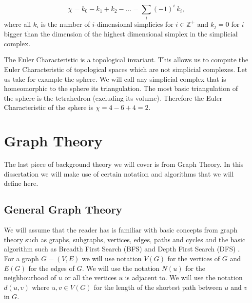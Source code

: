 %
%
%

%
%

$$ \chi = k_0 - k_1 + k_2 - ... = \sum_{i}{(-1)^i~k_i}, $$
where all $k_i$ is the number of $i$-dimensional simplicies for $i \in \mathbb{Z}^+$ and $k_j = 0$ for $i$ bigger than the dimension of the highest dimensional simplex in the simplicial complex.

The Euler Characteristic is a topological invariant. This allows us to compute the Euler Characteristic of topological spaces which are not simplicial complexes. Let us take for example the sphere. We will call any simplicial complex that is homeomorphic to the sphere its triangulation. The most basic triangulation of the sphere is the tetrahedron (excluding its volume). Therefore the Euler Characteristic of the sphere is $\chi = 4 - 6 + 4 = 2$.

\section{Graph Theory}

The last piece of background theory we will cover is from Graph Theory. In this dissertation we will make use of certain notation and algorithms that we will define here.

\subsection{General Graph Theory}

We will assume that the reader has is familiar with basic concepts from graph theory such as graphs, subgraphs, vertices, edges, paths and cycles and the basic algorithm such as Breadth First Search (BFS) and Depth First Search (DFS) \cite{intro-to-algo}. For a graph $G = (V, E)$ we will use notation $V(G)$ for the vertices of $G$ and $E(G)$ for the edges of $G$. We will use the notation $N(u)$ for the neighbourhood of $u$ or all the vertices $u$ is adjacent to. We will use the notation $d(u, v)$ where $u, v \in V(G)$ for the length of the shortest path between $u$ and $v$ in $G$.

